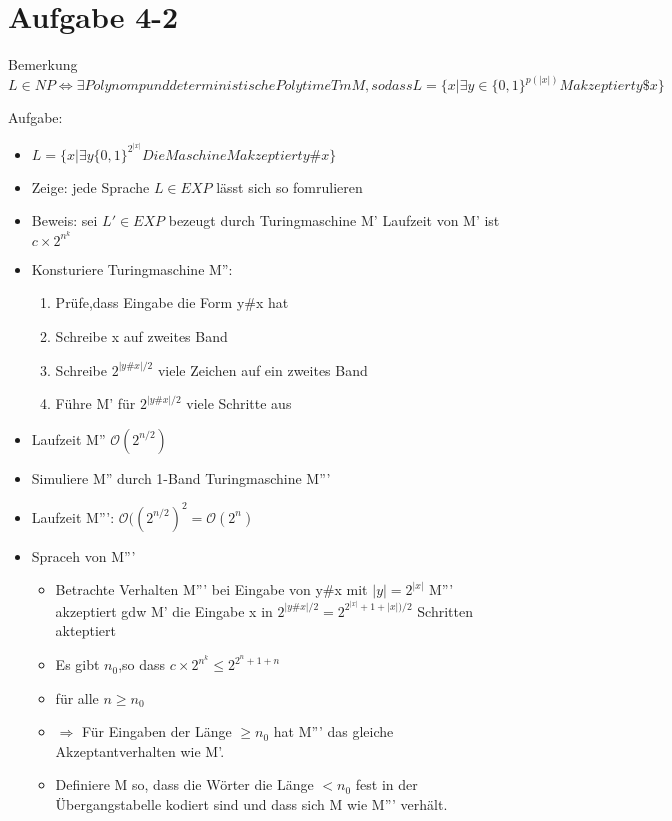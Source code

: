 \documentclass[12pt, oneside, a4paper, numbers=enddot, abstracton, parskip=full]{scrreprt}
\newcommand{\bigO}{\ensuremath{\mathcal{O}}}
\begin{document}
\section{Aufgabe 4-2}
Bemerkung
\begin{math}
  L\in NP \Leftrightarrow \exists Polynom p und deterministische
  Polytime Tm M,so dass
  L = \{x | \exists y \in \{0,1\}^{p(|x|)} M akzeptiert y \$ x \}
\end{math}

Aufgabe:
\begin{itemize}
\item \begin{math}
  L=\{ x | \exists y \{0,1\} ^ {2^{|x|}} Die Maschine M akzeptiert y
  \# x \}
\end{math}
\item Zeige: jede Sprache $L\in EXP $ lässt sich so fomrulieren
\item Beweis: sei $L' \in EXP$ bezeugt durch Turingmaschine M' Laufzeit von M' ist
  $ c \times 2 ^ {n^k}$

\item Konsturiere Turingmaschine M'':
  \begin{enumerate}
  \item Prüfe,dass Eingabe die Form y\#x hat
  \item Schreibe x auf zweites Band
  \item Schreibe $2^{|y\#x|/2}$ viele Zeichen auf ein zweites Band
  \item Führe M' für $2^{|y\#x|/2}$ viele Schritte aus
  \end{enumerate}
\item Laufzeit M'' $\bigO (2^{n/2}) $
\item Simuliere M'' durch 1-Band Turingmaschine M'''
\item Laufzeit M''': $\bigO ((2^{n/2})^2 = \bigO (2^n)$
\item Spraceh von M'''
  \begin{itemize}
  \item Betrachte Verhalten M''' bei Eingabe von y\#x mit
    $|y| =2^{|x|}$ M''' akzeptiert gdw M' die Eingabe x in
    $2^{|y\#x|/2} = 2^{2^{|x|} +1+|x|)/2}$ Schritten akteptiert
  \item Es gibt $n_0$,so dass $c\times2^{n^k} \leq  2^{2^n +1+n}$
  \item für alle $n\geq n_0$
  \item $\Rightarrow$ Für Eingaben der Länge $\geq n_0$ hat M''' das
    gleiche Akzeptantverhalten wie M'.            %
  \item Definiere M so, dass die Wörter die Länge $< n_0$  fest in der
    Übergangstabelle kodiert sind und dass sich M wie M''' verhält.
  \end{itemize}
\end{itemize}
\end{document}
